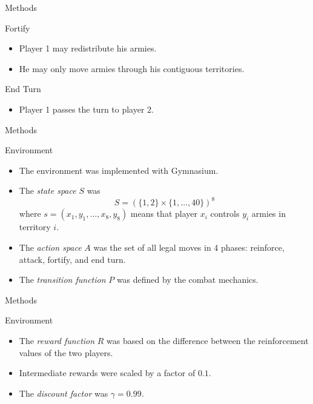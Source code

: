 \documentclass{beamer}
\begin{document}

\begin{frame}{Methods}

\begin{block}{Fortify \cite{risk1959}}
\begin{itemize}
\item Player 1 may redistribute his armies.
\item He may only move armies through his contiguous territories.
\end{itemize}
\end{block} 

\begin{block}{End Turn}
\begin{itemize}
\item Player 1 passes the turn to player 2.
\end{itemize}
\end{block}

\end{frame}


\begin{frame}{Methods}

\begin{block}{Environment \cite{towers2024gymnasium}}
\begin{itemize}
\item The environment was implemented with Gymnasium.
\item The \textit{state space} $S$ was 
$$S = (\{1, 2\} \times \{1, \ldots, 40\})^{8}$$
where $s = (x_{1}, y_{1}, \ldots, x_{8}, y_{8})$ means that player $x_{i}$ controls $y_{i}$ armies in territory $i$.
\item The \textit{action space} $A$ was the set of all legal moves in 4 phases: reinforce, attack, fortify, and end turn.
\item The \textit{transition function} $P$ was defined by the combat mechanics.
\end{itemize}
\end{block}
  
\end{frame}


\begin{frame}{Methods}

\begin{block}{Environment}
\begin{itemize}
\item The \textit{reward function} $R$ was based on the difference between the reinforcement values of the two players.
\item Intermediate rewards were scaled by a factor of $0.1$.
\item The \textit{discount factor} was $\gamma = 0.99$.
\end{itemize}
\end{block}
  
\end{frame}
\end{document}
